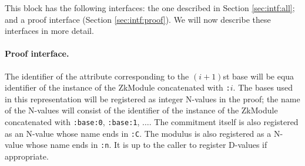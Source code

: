     This block has the following interfaces:
    the one described in Section \ref{sec:intf:all};
    and a proof interface (Section \ref{sec:intf:proof}).
      We will now describe these interfaces in more detail.

    \paragraph{Proof interface.}
    The identifier of the attribute corresponding to the $(i+1)$st base will
    be equa identifier of the instance of the ZkModule concatenated
    with \texttt{:$i$}.
    The bases used in this representation will be registered as integer N-values in
    the proof; the name of the N-values will consist of the identifier of the instance
    of the ZkModule concatenated with \texttt{:base:0}, \texttt{:base:1}, $\ldots$.
    The commitment itself is also registered as
    an N-value whose name ends in \texttt{:C}. The modulus is also registered as a
    N-value whose name ends in \texttt{:n}. It is up to the caller to register D-values
    if appropriate.

